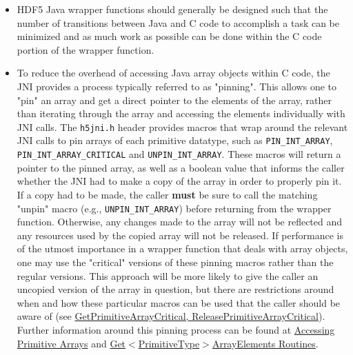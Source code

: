 \begin{itemize}
  \item HDF5 Java wrapper functions should generally be designed such that the number of transitions
  between Java and C code to accomplish a task can be minimized and as much work as possible can be
  done within the C code portion of the wrapper function.
  \item To reduce the overhead of accessing Java array objects within C code, the JNI provides a
  process typically referred to as "pinning". This allows one to "pin" an array and get a direct
  pointer to the elements of the array, rather than iterating through the array and accessing the
  elements individually with JNI calls. The \texttt{h5jni.h} header provides macros that wrap around
  the relevant JNI calls to pin arrays of each primitive datatype, such as \texttt{PIN\_INT\_ARRAY},
  \texttt{PIN\_INT\_ARRAY\_CRITICAL} and \texttt{UNPIN\_INT\_ARRAY}. These macros will return a pointer
  to the pinned array, as well as a boolean value that informs the caller whether the JNI had to make
  a copy of the array in order to properly pin it. If a copy had to be made, the caller \textbf{must}
  be sure to call the matching "unpin" macro (e.g., \texttt{UNPIN\_INT\_ARRAY}) before returning from
  the wrapper function. Otherwise, any changes made to the array will not be reflected and any resources
  used by the copied array will not be released. If performance is of the utmost importance in a wrapper
  function that deals with array objects, one may use the "critical" versions of these pinning macros
  rather than the regular versions. This approach will be more likely to give the caller an uncopied
  version of the array in question, but there are restrictions around when and how these particular
  macros can be used that the caller should be aware of (see \href{https://docs.oracle.com/en/java/javase/17/docs/specs/jni/functions.html#getprimitivearraycritical-releaseprimitivearraycritical}{GetPrimitiveArrayCritical, ReleasePrimitiveArrayCritical}).
  Further information around this pinning process can be found at \href{https://docs.oracle.com/en/java/javase/17/docs/specs/jni/design.html#accessing-primitive-arrays}{Accessing Primitive Arrays}
  and \href{https://docs.oracle.com/en/java/javase/17/docs/specs/jni/functions.html#getprimitivetypearrayelements-routines}{Get$<$PrimitiveType$>$ArrayElements Routines}.
\end{itemize}
